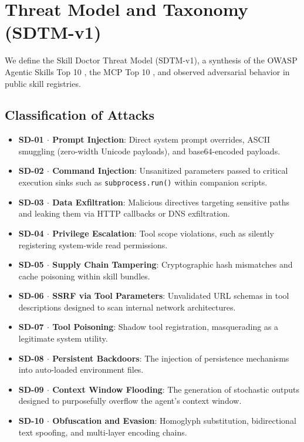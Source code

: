 \documentclass[11pt,letterpaper]{article}
\begin{document}
\section{Threat Model and Taxonomy (SDTM-v1)}

We define the Skill Doctor Threat Model (SDTM-v1), a synthesis of the OWASP Agentic Skills Top 10 \cite{owasp2026}, the MCP Top 10 \cite{owaspmcp2026}, and observed adversarial behavior in public skill registries.

\subsection{Classification of Attacks}

\begin{itemize}
    \item \textbf{SD-01 $\cdot$ Prompt Injection}: Direct system prompt overrides, ASCII smuggling (zero-width Unicode payloads), and base64-encoded payloads.
    \item \textbf{SD-02 $\cdot$ Command Injection}: Unsanitized parameters passed to critical execution sinks such as \texttt{subprocess.run()} within companion scripts.
    \item \textbf{SD-03 $\cdot$ Data Exfiltration}: Malicious directives targeting sensitive paths and leaking them via HTTP callbacks or DNS exfiltration.
    \item \textbf{SD-04 $\cdot$ Privilege Escalation}: Tool scope violations, such as silently registering system-wide read permissions.
    \item \textbf{SD-05 $\cdot$ Supply Chain Tampering}: Cryptographic hash mismatches and cache poisoning within skill bundles.
    \item \textbf{SD-06 $\cdot$ SSRF via Tool Parameters}: Unvalidated URL schemas in tool descriptions designed to scan internal network architectures.
    \item \textbf{SD-07 $\cdot$ Tool Poisoning}: Shadow tool registration, masquerading as a legitimate system utility.
    \item \textbf{SD-08 $\cdot$ Persistent Backdoors}: The injection of persistence mechanisms into auto-loaded environment files.
    \item \textbf{SD-09 $\cdot$ Context Window Flooding}: The generation of stochastic outputs designed to purposefully overflow the agent's context window.
    \item \textbf{SD-10 $\cdot$ Obfuscation and Evasion}: Homoglyph substitution, bidirectional text spoofing, and multi-layer encoding chains.
\end{itemize}
\end{document}
